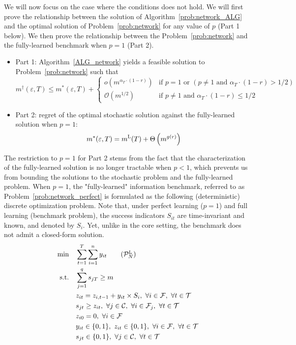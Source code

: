 \documentclass[nonblindrev]{informs3noheader}
\def\calC{\mathcal{C}}
\def\calF{\mathcal{F}}
\def\calO{\mathcal{O}}
\def\calP{\mathcal{P}}
\def\calT{\mathcal{T}}
\def\st{\text{s.t.}}
\begin{document}
We will now focus on the case where the conditions does not hold. We will first prove the relationship between the solution of Algorithm~\eqref{prob:network_ALG} and the optimal solution of Problem~\eqref{prob:network} for any value of $p$ (Part 1 below). We then prove the relationship between the Problem~\eqref{prob:network} and the fully-learned benchmark when $p=1$ (Part 2).
\begin{itemize}
    \item[--]  Part 1: Algorithm~\ref{ALG_network} yields a feasible solution to Problem~\eqref{prob:network} such that
$$m^\dagger(\varepsilon, T)\leq m^*(\varepsilon, T)+\begin{cases}
	o\left(m^{\alpha_T \cdot (1-r)}\right)& \text{if }p=1 \text{ or } (p \neq 1 \text{ and } \alpha_T\cdot(1-r)>1/2)\\
	\calO(m^{1/2}) & \text{if }p \neq 1\text{ and } \alpha_T\cdot(1-r)\leq 1/2        
\end{cases}$$
    \item[--] Part 2: regret of the optimal stochastic solution against the fully-learned solution when $p=1$:
    \[m^*(\varepsilon, T) = m^{\textsc{L}}(T)+\Theta\left(m^{g(r)}\right)\]
\end{itemize}

The restriction to $p=1$ for Part 2 stems from the fact that the characterization of the fully-learned solution is no longer tractable when $p<1$, which prevents us from bounding the solutions to the stochastic problem and the fully-learned problem. When $p=1$, the "fully-learned" information benchmark, referred to as Problem~\eqref{prob:network_perfect} is formulated as the following (deterministic) discrete optimization problem. Note that, under perfect learning ($p=1$) and full learning (benchmark problem), the success indicators $S_{it}$ are time-invariant and known, and denoted by $S_i$. Yet, unlike in the core setting, the benchmark does not admit a closed-form solution.
\begin{align}
    \min \quad & \sum_{t=1}^T \sum_{i=1}^n y_{it} \label{prob:network_perfect} \tag{$\calP_N^{\textsc{L}}$}\\
    \st\quad& \sum_{j=1}^q s_{jT} \geq  m \nonumber\\
    \quad&z_{it}=z_{i,t-1} + y_{it} \times S_i,\ \forall i\in\calF,\ \forall t\in\calT\nonumber\\
    & s_{jt} \geq z_{it} ,\ \forall j\in\calC,\ \forall i\in \calF_j, \ \forall t\in\calT\nonumber\\
    \quad& z_{i0}=0,\ \forall i\in\calF\nonumber\\
    \quad& y_{it}\in\{0,1\},\ z_{it}\in\{0,1\},\ \forall i\in \calF, \ \forall t\in\calT\nonumber\\
    \quad& s_{jt}\in\{0,1\},\ \forall j\in \calC, \ \forall t\in\calT\nonumber
\end{align}
\end{document}
